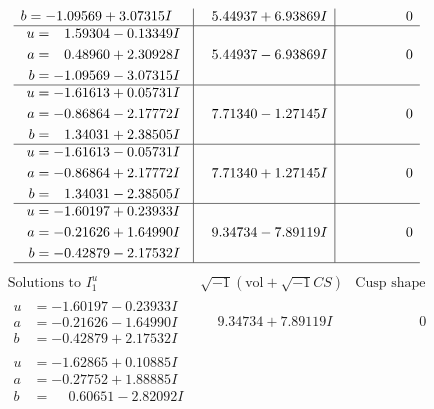 \documentclass[1p]{elsarticle_modified}
\theoremstyle{definition}
\newcommand{\I}{\sqrt{-1}}
\begin{document}
$$\begin{array}{c|c|c}
\begin{aligned}
b &= -1.09569 + 3.07315 I\end{aligned}
 & \phantom{-}5.44937 + 6.93869 I & \phantom{-0.000000 } 0 \\ \hline\begin{aligned}
u &= \phantom{-}1.59304 - 0.13349 I \\
a &= \phantom{-}0.48960 + 2.30928 I \\
b &= -1.09569 - 3.07315 I\end{aligned}
 & \phantom{-}5.44937 - 6.93869 I & \phantom{-0.000000 } 0 \\ \hline\begin{aligned}
u &= -1.61613 + 0.05731 I \\
a &= -0.86864 - 2.17772 I \\
b &= \phantom{-}1.34031 + 2.38505 I\end{aligned}
 & \phantom{-}7.71340 - 1.27145 I & \phantom{-0.000000 } 0 \\ \hline\begin{aligned}
u &= -1.61613 - 0.05731 I \\
a &= -0.86864 + 2.17772 I \\
b &= \phantom{-}1.34031 - 2.38505 I\end{aligned}
 & \phantom{-}7.71340 + 1.27145 I & \phantom{-0.000000 } 0 \\ \hline\begin{aligned}
u &= -1.60197 + 0.23933 I \\
a &= -0.21626 + 1.64990 I \\
b &= -0.42879 - 2.17532 I\end{aligned}
 & \phantom{-}9.34734 - 7.89119 I & \phantom{-0.000000 } 0\\
 \hline 
 \end{array}$$\newpage$$\begin{array}{c|c|c}  
\text{Solutions to }I^u_{1}& \I (\text{vol} + \sqrt{-1}CS) & \text{Cusp shape}\\
 \hline 
\begin{aligned}
u &= -1.60197 - 0.23933 I \\
a &= -0.21626 - 1.64990 I \\
b &= -0.42879 + 2.17532 I\end{aligned}
 & \phantom{-}9.34734 + 7.89119 I & \phantom{-0.000000 } 0 \\ \hline\begin{aligned}
u &= -1.62865 + 0.10885 I \\
a &= -0.27752 + 1.88885 I \\
b &= \phantom{-}0.60651 - 2.82092 I\end{aligned}

\end{array}$$
\end{document}
